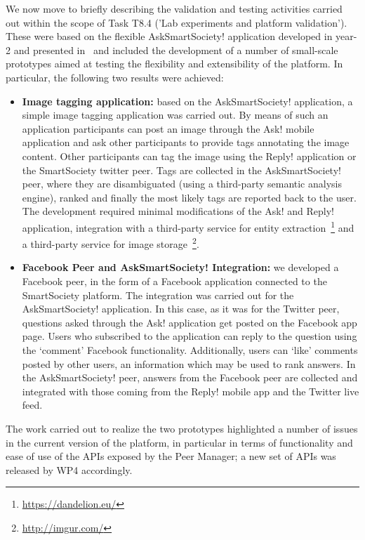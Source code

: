 We now move to briefly describing the validation and testing activities carried out within the scope of Task T8.4 ('Lab experiments and platform validation'). These were based on the flexible AskSmartSociety! application developed in year-2 and presented in~\cite{D8.2} and included the development of a number of small-scale prototypes aimed at testing the flexibility and extensibility of the platform. In particular, the following two results were achieved:
\begin{itemize}
\item {\bfseries Image tagging application:} based on the AskSmartSociety! application, a simple image tagging application was carried out. By means of such an application participants can post an image through the Ask! mobile application and ask other participants to provide tags annotating the image content. Other participants can tag the image using the Reply! application or the SmartSociety twitter peer. Tags are collected in the AskSmartSociety! peer, where they are disambiguated (using a third-party semantic analysis engine), ranked and finally the most likely tags are reported back to the user. The development required minimal modifications of the Ask! and Reply! application, integration with a third-party service for entity extraction~\footnote{\url{https://dandelion.eu/}} and a third-party service for image storage~\footnote{\url{http://imgur.com/}}.
\item {\bfseries Facebook Peer and AskSmartSociety! Integration:} we developed a Facebook peer, in the form of a Facebook application connected to the SmartSociety platform. The integration was carried out for the AskSmartSociety! application. In this case, as it was for the Twitter peer, questions asked through the Ask! application get posted on the Facebook app page. Users who subscribed to the application can reply to the question using the `comment' Facebook functionality. Additionally, users can `like' comments posted by other users, an information which may be used to rank answers. In the AskSmartSociety! peer, answers from the Facebook peer are collected and integrated with those coming from the Reply! mobile app and the Twitter live feed. 
\end{itemize}
The work carried out to realize the two prototypes highlighted a number of issues in the current version of the platform, in particular in terms of functionality and ease of use of the APIs exposed by the Peer Manager; a new set of APIs was released by WP4 accordingly.